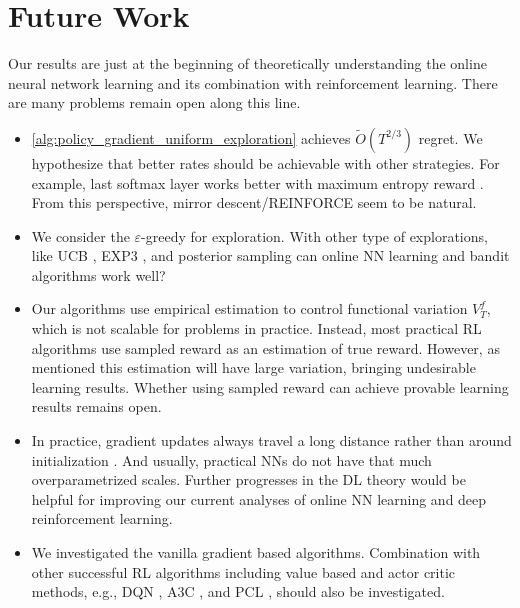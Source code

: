 \section{Future Work}
\label{sec:future_work}

Our results are just at the beginning of theoretically understanding the online neural network learning and its combination with reinforcement learning. There are many problems remain open along this line.
\begin{itemize}
    \item \cref{alg:policy_gradient_uniform_exploration} achieves $\tilde{O}(T^{2/3})$ regret. We hypothesize that better rates should be achievable with other strategies. For example, last softmax layer works better with maximum entropy reward \citep{nachum2017bridging}. From this perspective, mirror descent/REINFORCE seem to be natural.
        \item We consider the $\varepsilon$-greedy for exploration. With other type of explorations, like UCB \citep{auer2002finite}, EXP3 \citep{seldin2014one}, and posterior sampling \citep{agrawal2012analysis} can online NN learning and bandit algorithms work well?
    \item Our algorithms use empirical estimation to control functional variation $V_T^f$, which is not scalable for problems in practice. Instead, most practical RL algorithms use sampled reward as an estimation of true reward. However, as mentioned this estimation will have large variation, bringing undesirable learning results. Whether using sampled reward can achieve provable learning results remains open.
    \item In practice, gradient updates always travel a long distance rather than around initialization \citep{liu2018deeptracker}. And usually, practical NNs do not have that much overparametrized scales. Further progresses in the DL theory would be helpful for improving our current analyses of online NN learning and deep reinforcement learning.
    
    \item We investigated the vanilla gradient based algorithms. Combination with other successful RL algorithms including value based and actor critic methods, e.g., DQN \citep{mnih2015human}, A3C \citep{mnih2016asynchronous}, and PCL \citep{nachum2017bridging}, should also be investigated.
\end{itemize}

\nocite{langley00}
\fi